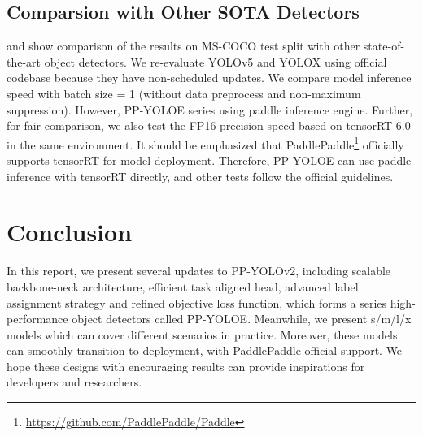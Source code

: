 \documentclass[final]{cvpr}
\begin{document}
\subsection{Comparsion with Other SOTA Detectors}

 and  show comparison of the results on MS-COCO test split with other state-of-the-art object detectors. We re-evaluate YOLOv5\cite{glenn_jocher_2022_6222936} and YOLOX\cite{ge2021yolox} using official codebase because they have non-scheduled updates. We compare model inference speed with batch size = 1 (without data preprocess and non-maximum suppression). However, PP-YOLOE series using paddle inference engine. Further, for fair comparison, we also test the FP16 precision speed based on tensorRT 6.0 in the same environment. It should be emphasized that PaddlePaddle\footnote{\scriptsize\url{https://github.com/PaddlePaddle/Paddle}\label{paddle}} officially supports tensorRT for model deployment. Therefore, PP-YOLOE can use paddle inference with tensorRT directly, and other tests follow the official guidelines.










\section{Conclusion}
In this report, we present several updates to PP-YOLOv2, including scalable backbone-neck architecture, efficient task aligned head, advanced label assignment strategy and refined objective loss function, which forms a series high-performance object detectors called PP-YOLOE. Meanwhile, we present s/m/l/x models which can cover different scenarios in practice. Moreover, these models can smoothly transition to deployment, with PaddlePaddle official support. We hope these designs with encouraging results can provide inspirations for developers and researchers.










{\small


}
\end{document}

